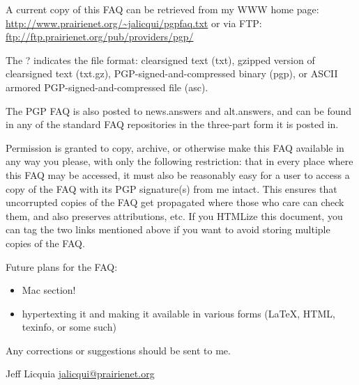 \documentclass[12pt]{article}
\begin{document}
A current copy of this FAQ can be retrieved from my WWW home page: \url{http://www.prairienet.org/~jalicqui/pgpfaq.txt} or via FTP: \url{ftp://ftp.prairienet.org/pub/providers/pgp/}

The ? indicates the file format: clearsigned text (txt), gzipped version of clearsigned text (txt.gz), PGP-signed-and-compressed binary (pgp), or ASCII armored PGP-signed-and-compressed file (asc).

The PGP FAQ is also posted to news.answers and alt.answers, and can be found in any of the standard FAQ repositories in the three-part form it is posted in.

Permission is granted to copy, archive, or otherwise make this FAQ available in any way you please, with only the following restriction: that in every place where this FAQ may be accessed, it must also be reasonably easy for a user to access a copy of the FAQ with its PGP signature(s) from me intact. This ensures that uncorrupted copies of the FAQ get propagated where those who care can check them, and also preserves attributions, etc. If you HTMLize this document, you can tag the two links mentioned above if you want to avoid storing multiple copies of the FAQ.

Future plans for the FAQ:
\begin{itemize}
\item Mac section!
\item hypertexting it and making it available in various forms (LaTeX, HTML, texinfo, or some such)
\end{itemize}

Any corrections or suggestions should be sent to me.

Jeff Licquia
\href{mailto:jalicqui@prairienet.org}{jalicqui@prairienet.org}
\end{document}
